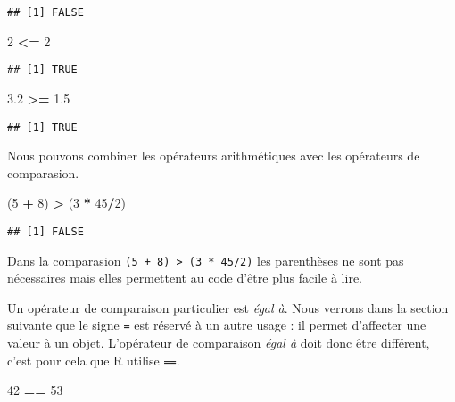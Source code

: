 \documentclass[]{book}
\newenvironment{Shaded}{\begin{snugshade}}{\end{snugshade}}
\newcommand{\DecValTok}[1]{\textcolor[rgb]{0.00,0.00,0.81}{#1}}
\newcommand{\FloatTok}[1]{\textcolor[rgb]{0.00,0.00,0.81}{#1}}
\newcommand{\StringTok}[1]{\textcolor[rgb]{0.31,0.60,0.02}{#1}}
\newcommand{\OperatorTok}[1]{\textcolor[rgb]{0.81,0.36,0.00}{\textbf{#1}}}
\newcommand{\NormalTok}[1]{#1}
\theoremstyle{definition}
\theoremstyle{definition}
\theoremstyle{definition}
\theoremstyle{remark}
\begin{document}
\begin{verbatim}
## [1] FALSE
\end{verbatim}

\begin{Shaded}
\begin{Highlighting}[]
\DecValTok{2} \OperatorTok{<=}\StringTok{ }\DecValTok{2}
\end{Highlighting}
\end{Shaded}

\begin{verbatim}
## [1] TRUE
\end{verbatim}

\begin{Shaded}
\begin{Highlighting}[]
\FloatTok{3.2} \OperatorTok{>=}\StringTok{ }\FloatTok{1.5}
\end{Highlighting}
\end{Shaded}

\begin{verbatim}
## [1] TRUE
\end{verbatim}

Nous pouvons combiner les opérateurs arithmétiques avec les opérateurs
de comparasion.

\begin{Shaded}
\begin{Highlighting}[]
\NormalTok{(}\DecValTok{5} \OperatorTok{+}\StringTok{ }\DecValTok{8}\NormalTok{) }\OperatorTok{>}\StringTok{ }\NormalTok{(}\DecValTok{3} \OperatorTok{*}\StringTok{ }\DecValTok{45}\OperatorTok{/}\DecValTok{2}\NormalTok{) }
\end{Highlighting}
\end{Shaded}

\begin{verbatim}
## [1] FALSE
\end{verbatim}

Dans la comparasion \texttt{(5\ +\ 8)\ \textgreater{}\ (3\ *\ 45/2)} les
parenthèses ne sont pas nécessaires mais elles permettent au code d'être
plus facile à lire.

Un opérateur de comparaison particulier est \emph{égal à}. Nous verrons
dans la section suivante que le signe \texttt{=} est réservé à un autre
usage : il permet d'affecter une valeur à un objet. L'opérateur de
comparaison \emph{égal à} doit donc être différent, c'est pour cela que
R utilise \texttt{==}.

\begin{Shaded}
\begin{Highlighting}[]
\DecValTok{42} \OperatorTok{==}\StringTok{ }\DecValTok{53}
\end{Highlighting}
\end{Shaded}
\end{document}
